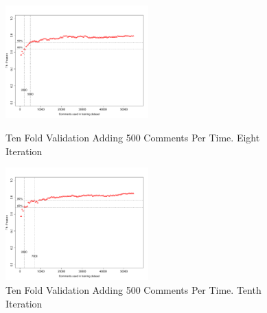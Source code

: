 \begin{figure}[thb!]
  \centering
  \vspace{-93mm}
  \includegraphics[width=0.49\textwidth]{figures/appendix/ten_fold_validation_design/ten_fold_validation_7_500.pdf}
  \vspace{-5mm}
  \caption{Ten Fold Validation Adding 500 Comments Per Time. Eight Iteration}
  \label{fig:design_ten_fold_validation_7_100}
  \includegraphics[width=0.49\textwidth]{figures/appendix/ten_fold_validation_design/ten_fold_validation_9_500.pdf}
  \vspace{-5mm}
  \caption{Ten Fold Validation Adding 500 Comments Per Time. Tenth Iteration}
  \label{fig:design_ten_fold_validation_9_100}
  
\end{figure}


